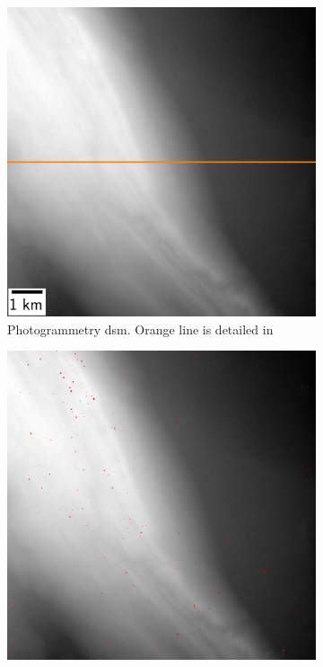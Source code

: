 \begin{figure}
    \begin{subfigure}[t]{0.49\linewidth}
        \flushleft
        \includegraphics[width=\linewidth]{Images/Chap_6/Graasubreen_dsm_zoom.png}
        \caption{Photogrammetry \acrshort{dsm}. Orange line is detailed in }
        \label{fig:Graasubreen_dsm_zoom}
    \end{subfigure}\hfill
    \begin{subfigure}[t]{0.49\linewidth}
        \flushright
        \includegraphics[width=\linewidth]{Images/Chap_6/Graasubreen_error_zoom.png}

\end{subfigure}
\end{figure}
